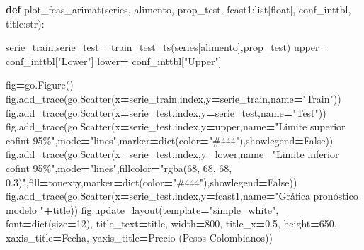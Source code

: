 \documentclass[
]{book}
\newenvironment{Shaded}{\begin{snugshade}}{\end{snugshade}}
\newcommand{\BuiltInTok}[1]{#1}
\newcommand{\DecValTok}[1]{\textcolor[rgb]{0.00,0.00,0.81}{#1}}
\newcommand{\FloatTok}[1]{\textcolor[rgb]{0.00,0.00,0.81}{#1}}
\newcommand{\KeywordTok}[1]{\textcolor[rgb]{0.13,0.29,0.53}{\textbf{#1}}}
\newcommand{\NormalTok}[1]{#1}
\newcommand{\OperatorTok}[1]{\textcolor[rgb]{0.81,0.36,0.00}{\textbf{#1}}}
\newcommand{\StringTok}[1]{\textcolor[rgb]{0.31,0.60,0.02}{#1}}
\newcommand{\VariableTok}[1]{\textcolor[rgb]{0.00,0.00,0.00}{#1}}
\begin{document}
\begin{Shaded}
\begin{Highlighting}[]

\KeywordTok{def}\NormalTok{ plot\_fcas\_arimat(series,}
\NormalTok{               alimento,}
\NormalTok{               prop\_test,}
\NormalTok{               fcast1:}\BuiltInTok{list}\NormalTok{[}\BuiltInTok{float}\NormalTok{],}
\NormalTok{               conf\_inttbl,}
\NormalTok{               title:}\BuiltInTok{str}\NormalTok{):}
                 
\NormalTok{      serie\_train,serie\_test}\OperatorTok{=}\NormalTok{ train\_test\_ts(series[alimento],prop\_test)}
\NormalTok{      upper}\OperatorTok{=}\NormalTok{ conf\_inttbl[}\StringTok{"Lower"}\NormalTok{]}
\NormalTok{      lower}\OperatorTok{=}\NormalTok{ conf\_inttbl[}\StringTok{"Upper"}\NormalTok{]}
      
\NormalTok{      fig}\OperatorTok{=}\NormalTok{go.Figure()}
\NormalTok{      fig.add\_trace(go.Scatter(x}\OperatorTok{=}\NormalTok{serie\_train.index,y}\OperatorTok{=}\NormalTok{serie\_train,name}\OperatorTok{=}\StringTok{"Train"}\NormalTok{))}
\NormalTok{      fig.add\_trace(go.Scatter(x}\OperatorTok{=}\NormalTok{serie\_test.index,y}\OperatorTok{=}\NormalTok{serie\_test,name}\OperatorTok{=}\StringTok{"Test"}\NormalTok{))}
\NormalTok{      fig.add\_trace(go.Scatter(x}\OperatorTok{=}\NormalTok{serie\_test.index,y}\OperatorTok{=}\NormalTok{upper,name}\OperatorTok{=}\StringTok{"Limite superior cofint 95\%"}\NormalTok{,mode}\OperatorTok{=}\StringTok{"lines"}\NormalTok{,marker}\OperatorTok{=}\BuiltInTok{dict}\NormalTok{(color}\OperatorTok{=}\StringTok{"\#444"}\NormalTok{),showlegend}\OperatorTok{=}\VariableTok{False}\NormalTok{))}
\NormalTok{      fig.add\_trace(go.Scatter(x}\OperatorTok{=}\NormalTok{serie\_test.index,y}\OperatorTok{=}\NormalTok{lower,name}\OperatorTok{=}\StringTok{"Limite inferior cofint 95\%"}\NormalTok{,mode}\OperatorTok{=}\StringTok{"lines"}\NormalTok{,fillcolor}\OperatorTok{=}\StringTok{"rgba(68, 68, 68,           0.3)"}\NormalTok{,fill}\OperatorTok{=}\StringTok{\textquotesingle{}tonexty\textquotesingle{}}\NormalTok{,marker}\OperatorTok{=}\BuiltInTok{dict}\NormalTok{(color}\OperatorTok{=}\StringTok{"\#444"}\NormalTok{),showlegend}\OperatorTok{=}\VariableTok{False}\NormalTok{))}
\NormalTok{      fig.add\_trace(go.Scatter(x}\OperatorTok{=}\NormalTok{serie\_test.index,y}\OperatorTok{=}\NormalTok{fcast1,name}\OperatorTok{=}\StringTok{"Gráfica pronóstico modelo "}\OperatorTok{+}\NormalTok{title))}
\NormalTok{      fig.update\_layout(template}\OperatorTok{=}\StringTok{"simple\_white"}\NormalTok{, font}\OperatorTok{=}\BuiltInTok{dict}\NormalTok{(size}\OperatorTok{=}\DecValTok{12}\NormalTok{), title\_text}\OperatorTok{=}\NormalTok{title,}
\NormalTok{                      width}\OperatorTok{=}\DecValTok{800}\NormalTok{, title\_x}\OperatorTok{=}\FloatTok{0.5}\NormalTok{, height}\OperatorTok{=}\DecValTok{650}\NormalTok{, xaxis\_title}\OperatorTok{=}\StringTok{\textquotesingle{}Fecha\textquotesingle{}}\NormalTok{,}
\NormalTok{                      yaxis\_title}\OperatorTok{=}\StringTok{\textquotesingle{}Precio (Pesos Colombianos)\textquotesingle{}}\NormalTok{)}
      

\end{Highlighting}
\end{Shaded}
\end{document}
